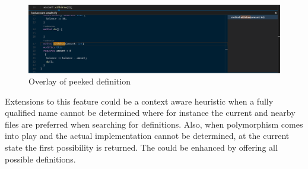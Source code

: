  \begin{figure}[H]
	\centering
	\includegraphics[width=1\textwidth]{img/goToDefinitionPeek}
	\caption{Overlay of peeked definition}
	\label{fig:gotodefinitionpeek}
\end{figure}
Extensions to this feature could be a context aware heuristic when a fully qualified name cannot be determined where for instance the current and nearby files are preferred when searching for definitions. Also, when polymorphism comes into play and the actual implementation cannot be determined, at the current state the first possibility is returned. The could be enhanced by offering all possible definitions.
